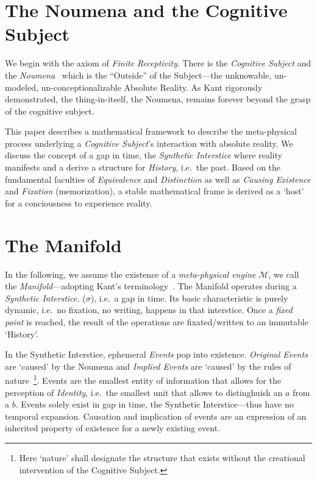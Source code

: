 \documentclass[11pt, a4paper]{article}
\theoremstyle{formalism}
\begin{document}
\section{The Noumena and the Cognitive Subject}

We begin with the axiom of \textit{Finite Receptivity}. There is the {\it
Cognitive Subject\/} and the {\it Noumena\/}~\cite{Kant1781} which is the
``Outside'' of the Subject---the unknowable, un-modeled, un-conceptionalizable
Absolute Reality. As Kant rigorously demonstrated, the thing-in-itself, the
Noumena, remains forever beyond the grasp of the cognitive subject. 

This paper describes a mathematical framework to describe the meta-physical
process underlying a {\it Cognitive Subject\/}'s interaction with absolute
reality. We discuss the concept of a gap in time, the {\it Synthetic
Interstice\/} where reality manifests and a derive a structure for {\it
History}, i.e.\ the past. Based on the fundamental faculties of {\it
Equivalence\/} and {\it Distinction\/} as well as {\it Causing Existence\/} and
{\it Fixation\/} (memorization), a stable mathematical frame is derived as a
`host' for a conciousness to experience reality.

\section{The Manifold}

In the following, we assume the existence of a {\it meta-physical engine\/}
$\mathcal{M}$, we call the {\it Manifold\/}---adopting Kant's
terminology~\cite{Kant1781}. The Manifold operates during a {\it Synthetic
Interstice.\/} ($\sigma$), i.e.\ a gap in time. Its basic characteristic is
purely dynamic, i.e.\ no fixation, no writing, happens in that interstice. Once
a {\it fixed point\/} is reached, the result of the operations are
fixated/written to an immutable `History'.

In the Synthetic Interstice, ephemeral {\it Events\/} pop into existence. {\it
Original Events\/} are `caused' by the Noumena and {\it Implied Events\/} are
`caused' by the rules of nature~\footnote{Here `nature' shall designate the
structure that exists without the creational intervention of the Cognitive
Subject.}. Events are the smallest entity of information that allows for the
perception of {\it Identity}, i.e.\ the smallest unit that allows to
distinghuish an $a$ from a $b$. Events solely exist in gap in time, the
Synthetic Interstice---thus have no temporal expansion. Causation and
implication of events are an expression of an inherited property of existence
for a newly existing event.\ 
\end{document}
